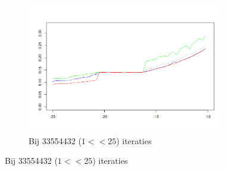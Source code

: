 \documentclass{article}
\begin{document}
\begin{figure}[!htb]
\begin{subfigure}{0.49\textwidth}
 \end{subfigure}
 \begin{subfigure}{0.49\textwidth}
  \caption{Bij 33554432 ($1 << 25$) iteraties}
  \includegraphics[width=0.95\textwidth]{elegant-gl/datasets/plot_prec_33554432it}
 \end{subfigure}
\end{figure}
\end{document}
